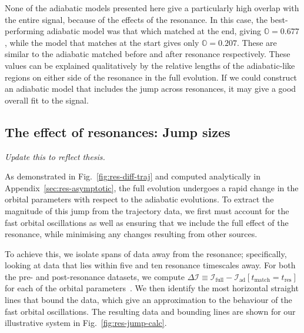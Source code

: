 \documentclass[aps,prd,amsfonts,amssymb,amsmath,nofootinbib,showpacs,superscriptaddress,twocolumn]{revtex4}
\newcommand{\figref}[1]{Fig.~\ref{fig:#1}}
\newcommand{\apref}[1]{Appendix~\ref{sec:#1}}
\newcommand{\sub}[1]{\ensuremath{_\mathrm{#1}}}
\begin{document}
None of the adiabatic models presented here give a particularly high overlap with the entire signal, because of the effects of the resonance. In this case, the best-performing adiabatic model was that which matched at the end, giving $\mathbb{O} = 0.677$, while the model that matches at the start gives only $\mathbb{O} = 0.207$. These are similar to the adiabatic matched before and after resonance respectively. These values can be explained qualitatively by the relative lengths of the adiabatic-like regions on either side of the resonance in the full evolution. If we could construct an adiabatic model that includes the jump across resonances, it may give a good overall fit to the signal.

\subsection{The effect of resonances: Jump sizes}
\label{sec:effres-jump}

\emph{Update this to reflect thesis.}

As demonstrated in \figref{res-diff-traj} and computed analytically in \apref{res-asymptotic}, the full evolution undergoes a rapid change in the orbital parameters with respect to the adiabatic evolutions. To extract the magnitude of this jump from the trajectory data, we first must account for the fast orbital oscillations as well as ensuring that we include the full effect of the resonance, while minimising any changes resulting from other sources.

To achieve this, we isolate spans of data away from the resonance; specifically, looking at data that lies within five and ten resonance timescales away. For both the pre- and post-resonance datasets, we compute $\Delta \mathcal{I} \equiv \mathcal{I}_{\mathrm{full}} - \mathcal{I}\sub{ad}[t_{\mathrm{match}} = t\sub{res}]$ for each of the orbital parameters~\cite{ColeThesis2015}. We then identify the most horizontal straight lines that bound the data, which give an approximation to the behaviour of the fast orbital oscillations. The resulting data and bounding lines are shown for our illustrative system in \figref{res-jump-calc}.
\end{document}
